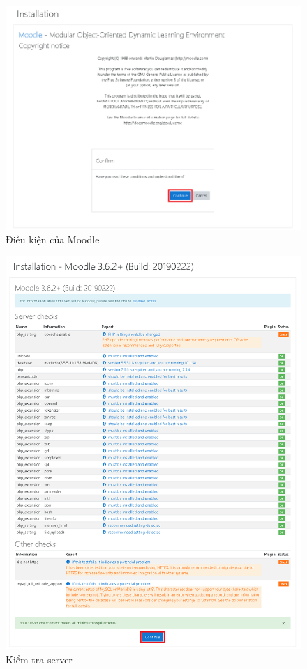 \begin{center}
	\begin{figure}[htp]
		\begin{center}
			\includegraphics[width=0.8\linewidth]{img/4}
		\end{center}
		\caption{Điều kiện của Moodle}
		\label{refhinh34}
	\end{figure}
\end{center}

\begin{center}
	\begin{figure}[htp]
		\begin{center}
			\includegraphics[width=0.65\linewidth]{img/5}
		\end{center}
		\caption{Kiểm tra server}
		\label{refhinh35}
	\end{figure}
\end{center}


